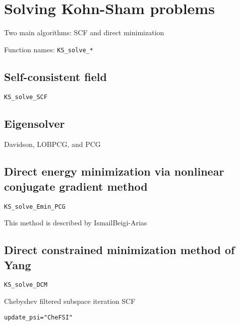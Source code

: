 \documentclass[a4paper,10pt]{paper}
\newcommand{\jlcode}[1]{\texttt{#1}}
\begin{document}
\section{Solving Kohn-Sham problems}

Two main algorithms: SCF and direct minimization

Function names: \jlcode{KS_solve_*}

\subsection{Self-consistent field}

\jlcode{KS_solve_SCF}

\subsection{Eigensolver}

Davidson, LOBPCG, and PCG

\subsection{Direct energy minimization via nonlinear conjugate gradient method}

\jlcode{KS_solve_Emin_PCG}

This method is described by IsmailBeigi-Arias

\subsection{Direct constrained minimization method of Yang}

\jlcode{KS_solve_DCM}

Chebyshev filtered subspace iteration SCF

\jlcode{update_psi="CheFSI"}
\end{document}
